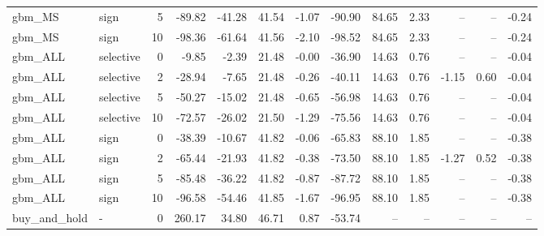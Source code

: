 \begin{tabular}{llrrrrrrrrrrr}
gbm_MS & sign & 5 & -89.82 & -41.28 & 41.54 & -1.07 & -90.90 & 84.65 & 2.33 & -- & -- & -0.24 \\
gbm_MS & sign & 10 & -98.36 & -61.64 & 41.56 & -2.10 & -98.52 & 84.65 & 2.33 & -- & -- & -0.24 \\
gbm_ALL & selective & 0 & -9.85 & -2.39 & 21.48 & -0.00 & -36.90 & 14.63 & 0.76 & -- & -- & -0.04 \\
gbm_ALL & selective & 2 & -28.94 & -7.65 & 21.48 & -0.26 & -40.11 & 14.63 & 0.76 & -1.15 & 0.60 & -0.04 \\
gbm_ALL & selective & 5 & -50.27 & -15.02 & 21.48 & -0.65 & -56.98 & 14.63 & 0.76 & -- & -- & -0.04 \\
gbm_ALL & selective & 10 & -72.57 & -26.02 & 21.50 & -1.29 & -75.56 & 14.63 & 0.76 & -- & -- & -0.04 \\
gbm_ALL & sign & 0 & -38.39 & -10.67 & 41.82 & -0.06 & -65.83 & 88.10 & 1.85 & -- & -- & -0.38 \\
gbm_ALL & sign & 2 & -65.44 & -21.93 & 41.82 & -0.38 & -73.50 & 88.10 & 1.85 & -1.27 & 0.52 & -0.38 \\
gbm_ALL & sign & 5 & -85.48 & -36.22 & 41.82 & -0.87 & -87.72 & 88.10 & 1.85 & -- & -- & -0.38 \\
gbm_ALL & sign & 10 & -96.58 & -54.46 & 41.85 & -1.67 & -96.95 & 88.10 & 1.85 & -- & -- & -0.38 \\
buy_and_hold & - & 0 & 260.17 & 34.80 & 46.71 & 0.87 & -53.74 & -- & -- & -- & -- & -- \\
\bottomrule
\end{tabular}
